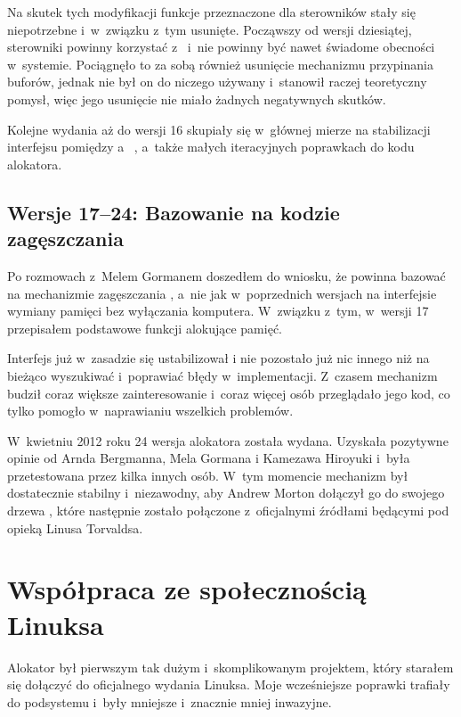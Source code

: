 Na skutek tych modyfikacji funkcje  przeznaczone dla
sterowników stały się niepotrzebne i~w~związku z~tym usunięte.
Począwszy od wersji dziesiątej, sterowniki powinny korzystać
z~  i~nie powinny być nawet świadome obecności
 w~systemie.  Pociągnęło to za sobą również usunięcie
mechanizmu przypinania buforów, jednak nie był on do niczego używany
i~stanowił raczej teoretyczny pomysł, więc jego usunięcie nie miało
żadnych negatywnych skutków.

Kolejne wydania  aż do wersji 16 skupiały się w~głównej mierze na
stabilizacji interfejsu pomiędzy  a~ , a~także małych
iteracyjnych poprawkach do kodu alokatora.

\subsection{Wersje 17--24: Bazowanie na kodzie zagęszczania}

Po rozmowach z~Melem Gormanem doszedłem do wniosku, że  powinna
bazować na mechanizmie zagęszczania \autocite{bib:compaction,
  bib:supporting-large-contig-regions}, a~nie jak w~poprzednich
wersjach na interfejsie wymiany pamięci  bez wyłączania komputera.
W~związku z~tym, w~wersji 17 przepisałem podstawowe funkcji alokujące
pamięć.

Interfejs  już w~zasadzie się ustabilizował i nie pozostało już nic
innego niż na bieżąco wyszukiwać i~poprawiać błędy w~implementacji.
Z~czasem mechanizm  budził coraz większe zainteresowanie i~coraz
więcej osób przeglądało jego kod, co tylko pomogło w~naprawianiu
wszelkich problemów.

W~kwietniu 2012 roku 24 wersja alokatora  została wydana.
Uzyskała pozytywne opinie od Arnda Bergmanna, Mela Gormana i Kamezawa
Hiroyuki i~była przetestowana przez kilka innych osób.  W~tym momencie
mechanizm  był dostatecznie stabilny i~niezawodny, aby Andrew
Morton dołączył go do swojego drzewa , które następnie
zostało połączone z~oficjalnymi źródłami będącymi pod opieką Linusa
Torvaldsa.

\section{Współpraca ze społecznością Linuksa}

Alokator  był pierwszym tak dużym i~skomplikowanym projektem, który
starałem się dołączyć do oficjalnego wydania Linuksa.  Moje
wcześniejsze poprawki trafiały do podsystemu  i~były mniejsze
i~znacznie mniej inwazyjne.

